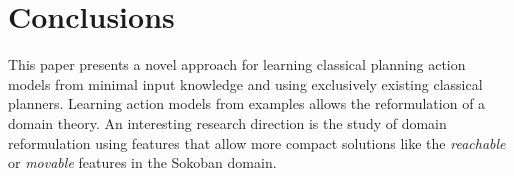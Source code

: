 \documentclass[letterpaper]{article} %
\begin{document}
\section{Conclusions}
This paper presents a novel approach for learning classical planning action models from minimal input knowledge and using exclusively existing classical planners. Learning action models from examples allows the reformulation of a domain theory. An interesting research direction is the study of domain reformulation using features that allow more compact solutions like the {\em reachable} or {\em movable} features in the Sokoban domain.



\end{document}
